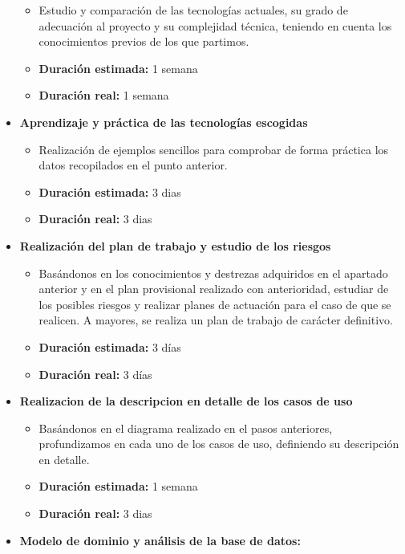 \documentclass[openright,twoside,10pt]{book}
\providecommand{\tightlist}{%
  \setlength{\itemsep}{0pt}\setlength{\parskip}{0pt}}
\begin{document}
\begin{itemize}
      \begin{itemize}
      \tightlist
      \item
        Estudio y comparación de las tecnologías actuales, su grado de
        adecuación al proyecto y su complejidad técnica, teniendo en cuenta
        los conocimientos previos de los que partimos.
      \item
        \textbf{Duración estimada:} 1 semana
      \item
        \textbf{Duración real:} 1 semana
      \end{itemize}
    \item
      \textbf{Aprendizaje y práctica de las tecnologías escogidas}
    
      \begin{itemize}
      \tightlist
      \item
        Realización de ejemplos sencillos para comprobar de forma práctica
        los datos recopilados en el punto anterior.
      \item
        \textbf{Duración estimada:} 3 dias
      \item
        \textbf{Duración real:} 3 dias
      \end{itemize}
    \item
      \textbf{Realización del plan de trabajo y estudio de los riesgos}
    
      \begin{itemize}
      \tightlist
      \item
        Basándonos en los conocimientos y destrezas adquiridos en el
        apartado anterior y en el plan provisional realizado con
        anterioridad, estudiar de los posibles riesgos y realizar planes de
        actuación para el caso de que se realicen. A mayores, se realiza un
        plan de trabajo de carácter definitivo.
      \item
        \textbf{Duración estimada:} 3 días
      \item
        \textbf{Duración real:} 3 días
      \end{itemize}
    \item
      \textbf{Realizacion de la descripcion en detalle de los casos de uso}
    
      \begin{itemize}
      \tightlist
      \item
        Basándonos en el diagrama realizado en el pasos anteriores,
        profundizamos en cada uno de los casos de uso, definiendo su
        descripción en detalle.
      \item
        \textbf{Duración estimada:} 1 semana
      \item
        \textbf{Duración real:} 3 dias
      \end{itemize}
    \item
      \textbf{Modelo de dominio y análisis de la base de datos:}
    

\end{itemize}
\end{document}
